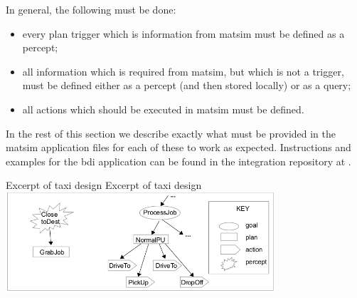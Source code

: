 In general, the following must be done:
\begin{itemize}\styleItemize
\item every plan trigger which is information from \gls{matsim} must
be defined as a percept; 
\item all information which is required from
\gls{matsim}, but which is not a trigger, must be defined either as a
percept (and then stored locally) or as a query; 
\item all actions which should be executed in \gls{matsim} must be defined.
\end{itemize}
%
In the rest of this section we describe exactly what must be provided
in the \gls{matsim} application files for each of these to work as
expected. Instructions and examples for the \gls{bdi} application can be
found in the integration repository at \url{}.


\createfigure%
{Excerpt of taxi design}%
{Excerpt of taxi design}%
{\label{taxigptree}}%
{\includegraphics[width=0.75\textwidth]{extending/figures/bdi/fig-taxi-gptree.jpg}}%
{}

